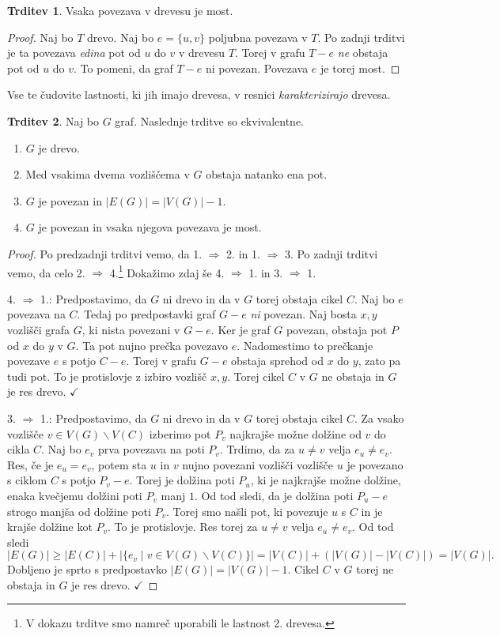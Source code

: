 \documentclass[11pt]{book}
\def\kljuka{$\checkmark$}
\theoremstyle{definition}
\theoremstyle{zgled}
\theoremstyle{odprtproblem}
\theoremstyle{domacanaloga}
\newenvironment{dokaz}
    {\color{siva}\begin{proof}}
    {\end{proof}}
\theoremstyle{izrek}
\newtheorem*{trditev}{Trditev}
\begin{document}
\begin{trditev}
Vsaka povezava v drevesu je most.
\end{trditev}
\begin{dokaz}
    Naj bo $T$ drevo. Naj bo $e = \{ u, v \}$ poljubna povezava v $T$. Po zadnji trditvi je ta povezava \emph{edina} pot od $u$ do $v$ v drevesu $T$. Torej v grafu $T - e$ \emph{ne} obstaja pot od $u$ do $v$. To pomeni, da graf $T - e$ ni povezan. Povezava $e$ je torej most.
\end{dokaz}

Vse te čudovite lastnosti, ki jih imajo drevesa, v resnici \emph{karakterizirajo} drevesa.

\begin{trditev}
    Naj bo $G$ graf. Naslednje trditve so ekvivalentne.
    \begin{enumerate}
        \item $G$ je drevo.
        \item Med vsakima dvema vozliščema v $G$ obstaja natanko ena pot.
        \item $G$ je povezan in $|E(G)| = |V(G)| - 1$.
        \item $G$ je povezan in vsaka njegova povezava je most.
    \end{enumerate}
\end{trditev}
\begin{dokaz}
Po predzadnji trditvi vemo, da 1. $\Rightarrow$ 2. in 1. $\Rightarrow$ 3. Po zadnji trditvi vemo, da celo 2. $\Rightarrow$ 4.\footnote{V dokazu trditve smo namreč uporabili le lastnost 2. drevesa.} Dokažimo zdaj še 4. $\Rightarrow$ 1. in 3. $\Rightarrow$ 1.

4. $\Rightarrow$ 1.: Predpostavimo, da $G$ ni drevo in da v $G$ torej obstaja cikel $C$. Naj bo $e$ povezava na $C$. Tedaj po predpostavki graf $G - e$ \emph{ni} povezan. Naj bosta $x,y$ vozlišči grafa $G$, ki nista povezani v $G - e$. Ker je graf $G$ povezan, obstaja pot $P$ od $x$ do $y$ v $G$. Ta pot nujno prečka povezavo $e$. Nadomestimo to prečkanje povezave $e$ s potjo $C - e$. Torej v grafu $G - e$ obstaja sprehod od $x$ do $y$, zato pa tudi pot. To je protislovje z izbiro vozlišč $x,y$. Torej cikel $C$ v $G$ ne obstaja in $G$ je res drevo. \kljuka

3. $\Rightarrow$ 1.: Predpostavimo, da $G$ ni drevo in da v $G$ torej obstaja cikel $C$. Za vsako vozlišče $v \in V(G) \backslash V(C)$ izberimo pot $P_v$ najkrajše možne dolžine od $v$ do cikla $C$. Naj bo $e_v$ prva povezava na poti $P_v$. Trdimo, da za $u \neq v$ velja $e_u \neq e_v$. Res, če je $e_u = e_v$, potem sta $u$ in $v$ nujno povezani vozlišči vozlišče $u$ je povezano s ciklom $C$ s potjo $P_v - e$. Torej je dolžina poti $P_u$, ki je najkrajše možne dolžine, enaka kvečjemu dolžini poti $P_v$ manj $1$. Od tod sledi, da je dolžina poti $P_u - e$ strogo manjša od dolžine poti $P_v$. Torej smo našli pot, ki povezuje $u$ s $C$ in je krajše dolžine kot $P_v$. To je protislovje. Res torej za $u \neq v$ velja $e_u \neq e_v$. Od tod sledi
\[
    |E(G)| \geq |E(C)| + |\{ e_v \mid v \in V(G) \backslash V(C) \}|
    = |V(C)| + (|V(G)| - |V(C)|)
    = |V(G)|.
\]
Dobljeno je sprto s predpostavko $|E(G)| = |V(G)| - 1$. Cikel $C$ v $G$ torej ne obstaja in $G$ je res drevo. \kljuka
\end{dokaz}
\end{document}
